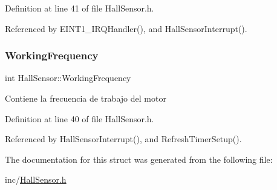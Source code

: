 Definition at line 41 of file Hall\+Sensor.\+h.



Referenced by E\+I\+N\+T1\+\_\+\+I\+R\+Q\+Handler(), and Hall\+Sensor\+Interrupt().

\mbox{\label{structHallSensor_aa9598178f2fba9eae32ca1f27fedb76d}} 
\subsubsection{\texorpdfstring{Working\+Frequency}{WorkingFrequency}}
{\footnotesize\ttfamily int Hall\+Sensor\+::\+Working\+Frequency}

Contiene la frecuencia de trabajo del motor 

Definition at line 40 of file Hall\+Sensor.\+h.



Referenced by Hall\+Sensor\+Interrupt(), and Refresh\+Timer\+Setup().



The documentation for this struct was generated from the following file\+:\begin{DoxyCompactItemize}
\item 
inc/\mbox{\hyperlink{HallSensor_8h}{Hall\+Sensor.\+h}}\end{DoxyCompactItemize}
